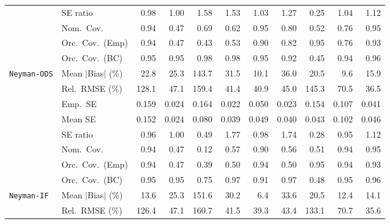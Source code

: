 \begin{landscape}
\begin{longtable}{llrrrrrrrrr}
 & SE ratio & \cellcolor{ranktwo}0.98 & \cellcolor{rankone}1.00 & 1.58 & 1.53 & \cellcolor{rankthree}1.03 & 1.27 & 0.25 & 1.04 & 1.12 \\
 & Nom.\ Cov. & \cellcolor{ranktwo}0.94 & 0.47 & 0.69 & 0.62 & \cellcolor{rankone}0.95 & \cellcolor{rankthree}0.80 & 0.52 & 0.76 & \cellcolor{rankone}0.95 \\
 & Orc.\ Cov.\ (Emp) & \cellcolor{ranktwo}0.94 & 0.47 & 0.43 & 0.53 & 0.90 & 0.82 & \cellcolor{rankone}0.95 & 0.76 & \cellcolor{rankthree}0.93 \\
 & Orc.\ Cov.\ (BC) & \cellcolor{rankone}0.95 & \cellcolor{ranktwo}0.95 & \cellcolor{rankthree}0.98 & \cellcolor{rankthree}0.98 & \cellcolor{rankone}0.95 & \cellcolor{rankthree}0.92 & 0.45 & \cellcolor{ranktwo}0.94 & \cellcolor{ranktwo}0.96 \\
\addlinespace[2pt]
\quad \texttt{Neyman-ODS} & Mean $|$Bias$|$ (\%) & 22.8 & 25.3 & 143.7 & 31.5 & \cellcolor{ranktwo}10.1 & 36.0 & 20.5 & \cellcolor{rankone}9.6 & \cellcolor{rankthree}15.9 \\
 & Rel.\ RMSE (\%) & 128.1 & 47.1 & 159.4 & \cellcolor{rankthree}41.4 & \cellcolor{ranktwo}40.9 & 45.0 & 145.3 & 70.5 & \cellcolor{rankone}36.5 \\
 & Emp.\ SE & 0.159 & 0.024 & 0.164 & 0.022 & 0.050 & 0.023 & 0.154 & 0.107 & 0.041 \\
 & Mean SE & 0.152 & 0.024 & 0.080 & 0.039 & 0.049 & 0.040 & 0.043 & 0.102 & 0.046 \\
 & SE ratio & \cellcolor{rankthree}0.96 & \cellcolor{rankone}1.00 & 0.49 & 1.77 & \cellcolor{ranktwo}0.98 & 1.74 & 0.28 & 0.95 & 1.12 \\
 & Nom.\ Cov. & \cellcolor{ranktwo}0.94 & 0.47 & 0.12 & 0.57 & \cellcolor{rankthree}0.90 & 0.56 & 0.51 & \cellcolor{ranktwo}0.94 & \cellcolor{rankone}0.95 \\
 & Orc.\ Cov.\ (Emp) & \cellcolor{ranktwo}0.94 & 0.47 & 0.39 & 0.50 & \cellcolor{ranktwo}0.94 & 0.50 & \cellcolor{rankone}0.95 & \cellcolor{ranktwo}0.94 & \cellcolor{rankthree}0.93 \\
 & Orc.\ Cov.\ (BC) & \cellcolor{rankone}0.95 & \cellcolor{ranktwo}0.95 & 0.75 & \cellcolor{rankthree}0.97 & 0.91 & 0.97 & 0.48 & \cellcolor{rankone}0.95 & \cellcolor{ranktwo}0.96 \\
\addlinespace[2pt]
\quad \texttt{Neyman-IF} & Mean $|$Bias$|$ (\%) & \cellcolor{rankthree}13.6 & 25.3 & 151.6 & 30.2 & \cellcolor{rankone}6.4 & 33.6 & 20.5 & \cellcolor{ranktwo}12.4 & 14.1 \\
 & Rel.\ RMSE (\%) & 126.4 & 47.1 & 160.7 & \cellcolor{rankthree}41.5 & \cellcolor{ranktwo}39.3 & 43.4 & 133.1 & 70.7 & \cellcolor{rankone}35.6 \\

\end{longtable}
\end{landscape}
